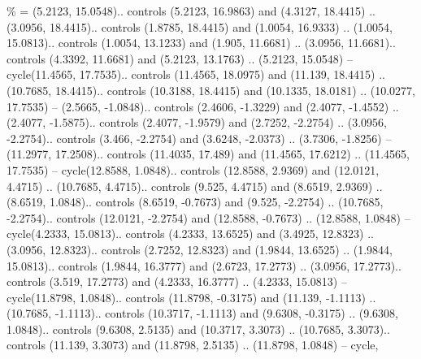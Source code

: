 {\%} = {(5.2123, 15.0548).. controls (5.2123, 16.9863) and (4.3127, 18.4415) .. (3.0956, 18.4415).. controls (1.8785, 18.4415) and (1.0054, 16.9333) .. (1.0054, 15.0813).. controls (1.0054, 13.1233) and (1.905, 11.6681) .. (3.0956, 11.6681).. controls (4.3392, 11.6681) and (5.2123, 13.1763) .. (5.2123, 15.0548) -- cycle(11.4565, 17.7535).. controls (11.4565, 18.0975) and (11.139, 18.4415) .. (10.7685, 18.4415).. controls (10.3188, 18.4415) and (10.1335, 18.0181) .. (10.0277, 17.7535) -- (2.5665, -1.0848).. controls (2.4606, -1.3229) and (2.4077, -1.4552) .. (2.4077, -1.5875).. controls (2.4077, -1.9579) and (2.7252, -2.2754) .. (3.0956, -2.2754).. controls (3.466, -2.2754) and (3.6248, -2.0373) .. (3.7306, -1.8256) -- (11.2977, 17.2508).. controls (11.4035, 17.489) and (11.4565, 17.6212) .. (11.4565, 17.7535) -- cycle(12.8588, 1.0848).. controls (12.8588, 2.9369) and (12.0121, 4.4715) .. (10.7685, 4.4715).. controls (9.525, 4.4715) and (8.6519, 2.9369) .. (8.6519, 1.0848).. controls (8.6519, -0.7673) and (9.525, -2.2754) .. (10.7685, -2.2754).. controls (12.0121, -2.2754) and (12.8588, -0.7673) .. (12.8588, 1.0848) -- cycle(4.2333, 15.0813).. controls (4.2333, 13.6525) and (3.4925, 12.8323) .. (3.0956, 12.8323).. controls (2.7252, 12.8323) and (1.9844, 13.6525) .. (1.9844, 15.0813).. controls (1.9844, 16.3777) and (2.6723, 17.2773) .. (3.0956, 17.2773).. controls (3.519, 17.2773) and (4.2333, 16.3777) .. (4.2333, 15.0813) -- cycle(11.8798, 1.0848).. controls (11.8798, -0.3175) and (11.139, -1.1113) .. (10.7685, -1.1113).. controls (10.3717, -1.1113) and (9.6308, -0.3175) .. (9.6308, 1.0848).. controls (9.6308, 2.5135) and (10.3717, 3.3073) .. (10.7685, 3.3073).. controls (11.139, 3.3073) and (11.8798, 2.5135) .. (11.8798, 1.0848) -- cycle},
